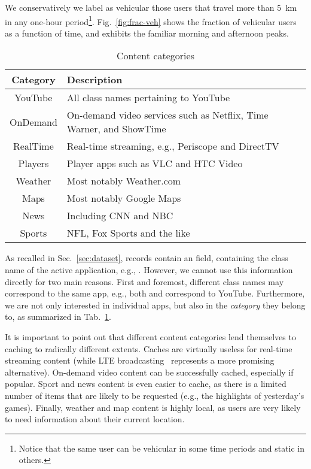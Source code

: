 \documentclass{sig-alternate-05-2015}
\newcommand{\Fig}[1]{Fig.~\ref{fig:#1}}
\newcommand{\Sec}[1]{Sec.~\ref{sec:#1}}
\newcommand{\Tab}[1]{Tab.~\ref{tab:#1}}
\begin{document}
We conservatively we label as vehicular those users that travel more than 5~km in any one-hour period\footnote{Notice that the same user can be vehicular in some time periods and static in others.}. \Fig{frac-veh} shows the fraction of vehicular users as a function of time, and exhibits the familiar morning and afternoon peaks.

\begin{table}[]
\caption{
Content categories
\label{tab:categories}
} \centering\footnotesize
\begin{tabularx}{1\columnwidth}{|c|X|}
\hline
Category & Description \\
\hline\hline
YouTube & All class names pertaining to YouTube\\
\hline
OnDemand & On-demand video services such as Netflix, Time Warner, and ShowTime\\
\hline
RealTime & Real-time streaming, e.g., Periscope and DirectTV\\
\hline
Players & Player apps such as VLC and HTC Video\\
\hline
Weather & Most notably Weather.com\\
\hline
Maps & Most notably Google Maps\\
\hline
News & Including CNN and NBC\\
\hline
Sports & NFL, Fox Sports and the like\\
\hline
\end{tabularx}
\vspace{-4mm}
\end{table}

As recalled in \Sec{dataset}, records contain an  field,
containing the class name of the active application, e.g.,
. However, we cannot use
this information directly for two main reasons. First and foremost,
different class names may correspond to the same app, e.g., both
 and
 correspond to YouTube. Furthermore,
we are not only interested in individual apps, but also in the {\em category} they belong to, as summarized in \Tab{categories}.

It is important to point out that different content categories lend themselves to caching to radically different extents. Caches are virtually useless for real-time streaming content (while LTE broadcasting~\cite{noi-broadcasting} represents a more promising alternative). On-demand video content can be successfully cached, especially if popular. Sport and news content is even easier to cache, as there is a limited number of items that are likely to be requested (e.g., the highlights of yesterday's games). Finally, weather and map content is highly local, as users are very likely to need information about their current location.
\end{document}

